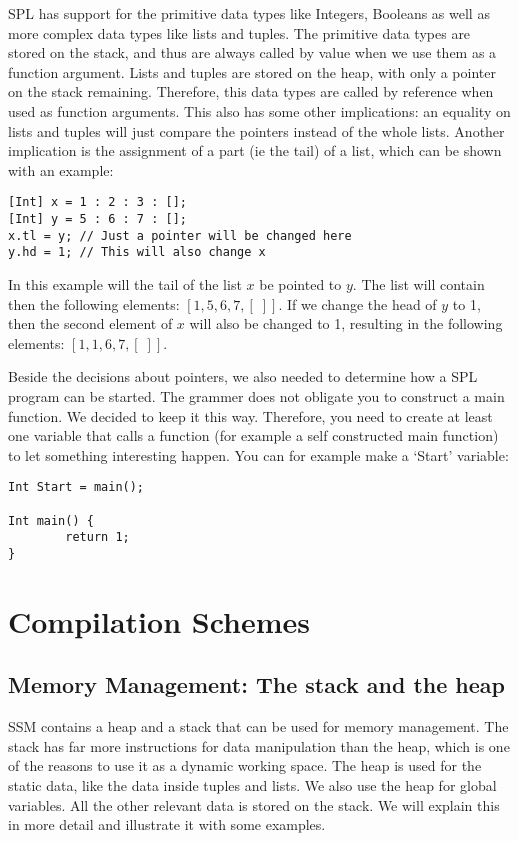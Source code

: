 \documentclass[a4paper]{article}
\begin{document}
SPL has support for the primitive data types like Integers, Booleans as well as more complex data types like lists and tuples. The primitive data types are stored on the stack, and thus are always called by value when we use them as a function argument. Lists and tuples are stored on the heap, with only a pointer on the stack remaining. Therefore, this data types are called by reference when used as function arguments. This also has some other implications: an equality on lists and tuples will just compare the pointers instead of the whole lists. Another implication is the assignment of a part (ie the tail) of a list, which can be shown with an example:
\begin{verbatim}
[Int] x = 1 : 2 : 3 : [];
[Int] y = 5 : 6 : 7 : [];
x.tl = y; // Just a pointer will be changed here
y.hd = 1; // This will also change x
\end{verbatim}
In this example will the tail of the list $x$ be pointed to $y$. The list will contain then the following elements: $[1, 5, 6, 7, [\;]]$. If we change the head of $y$ to 1, then the second element of $x$ will also be changed to 1, resulting in the following elements: $[1, 1, 6, 7, [\;]]$.

Beside the decisions about pointers, we also needed to determine how a SPL program can be started. The grammer does not obligate you to construct a main function. We decided to keep it this way. Therefore, you need to create at least one variable that calls a function (for example a self constructed main function) to let something interesting happen. You can for example make a `Start' variable:
\begin{verbatim}
Int Start = main();

Int main() {
        return 1;
}
\end{verbatim}

\section{Compilation Schemes}

\subsection{Memory Management: The stack and the heap}
SSM contains a heap and a stack that can be used for memory management. The stack has far more instructions for data manipulation than the heap, which is one of the reasons to use it as a dynamic working space. The heap is used for the static data, like the data inside tuples and lists. We also use the heap for global variables. All the other relevant data is stored on the stack. We will explain this in more detail and illustrate it with some examples. 
\end{document}
